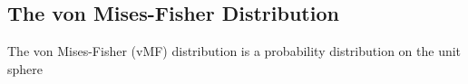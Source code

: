 \subsection{The von Mises-Fisher Distribution}

The von Mises-Fisher (vMF) distribution is a probability distribution on the unit sphere